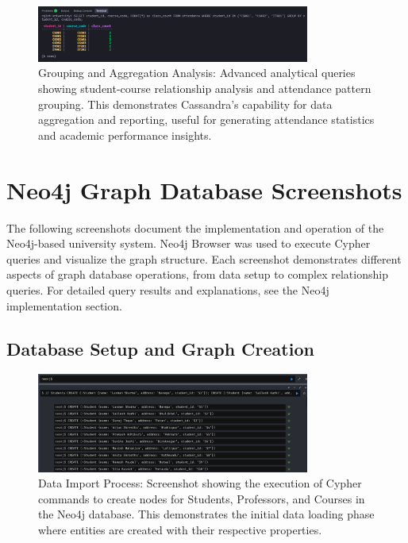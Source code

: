 \begin{figure}[H]
  \centering
  \includegraphics[width=0.8\textwidth]{task-2/screenshots/student-course-group.png}
  \caption{Grouping and Aggregation Analysis: Advanced analytical queries showing student-course relationship analysis and attendance pattern grouping. This demonstrates Cassandra's capability for data aggregation and reporting, useful for generating attendance statistics and academic performance insights.}
  \label{fig:task2-student-course-group}
\end{figure}

\section{Neo4j Graph Database Screenshots}

The following screenshots document the implementation and operation of the Neo4j-based university system. Neo4j Browser was used to execute Cypher queries and visualize the graph structure. Each screenshot demonstrates different aspects of graph database operations, from data setup to complex relationship queries. For detailed query results and explanations, see the Neo4j implementation section.

\subsection*{Database Setup and Graph Creation}

\begin{figure}[H]
  \centering
  \includegraphics[width=0.8\textwidth]{task-3/screenshots/import-data.png}
  \caption{Data Import Process: Screenshot showing the execution of Cypher commands to create nodes for Students, Professors, and Courses in the Neo4j database. This demonstrates the initial data loading phase where entities are created with their respective properties.}
  \label{fig:task3-import-data}
\end{figure}

